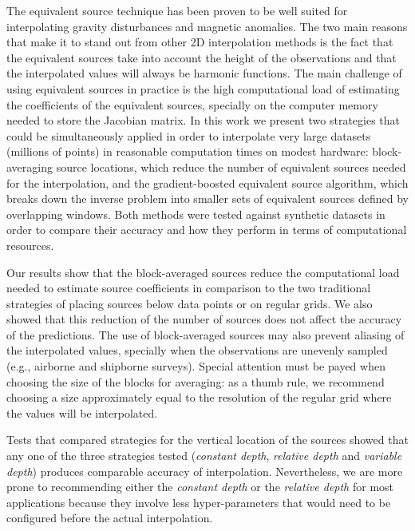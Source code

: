 The equivalent source technique has been proven to be well suited for
interpolating gravity disturbances and magnetic anomalies.
The two main reasons that make it to stand out from other 2D interpolation
methods is the fact that the equivalent sources take into account the height of
the observations and that the interpolated values will always be harmonic
functions.
The main challenge of using equivalent sources in practice is the high
computational load of estimating the coefficients of the equivalent sources,
specially on the computer memory needed to store the Jacobian matrix.
In this work we present two strategies that could be simultaneously applied in
order to interpolate very large datasets (millions of points) in reasonable
computation times on modest hardware:
block-averaging source locations, which reduce the number of equivalent sources
needed for the interpolation,
and the gradient-boosted equivalent source algorithm, which breaks down the
inverse problem into smaller sets of equivalent sources defined by overlapping
windows.
Both methods were tested against synthetic datasets in order to compare their
accuracy and how they perform in terms of computational resources.

Our results show that the block-averaged sources reduce the computational
load needed to estimate source coefficients in comparison to the two traditional
strategies of placing sources below data points or on regular grids.
We also showed that this reduction of the number of sources does not affect
the accuracy of the predictions.
The use of block-averaged sources may also prevent aliasing of the interpolated
values, specially when the observations are unevenly sampled (e.g., airborne
and shipborne surveys).
Special attention must be payed when choosing the size of the blocks for
averaging: as a thumb rule, we recommend choosing a size approximately equal to
the resolution of the regular grid where the values will be interpolated.

Tests that compared strategies for the vertical location of the
sources showed that any one of the three strategies tested
(\emph{constant depth}, \emph{relative depth} and \emph{variable depth})
produces comparable accuracy of interpolation.
Nevertheless, we are more prone to recommending either the \emph{constant
depth} or the \emph{relative depth} for most applications because they involve
less hyper-parameters that would need to be configured before the actual
interpolation.

